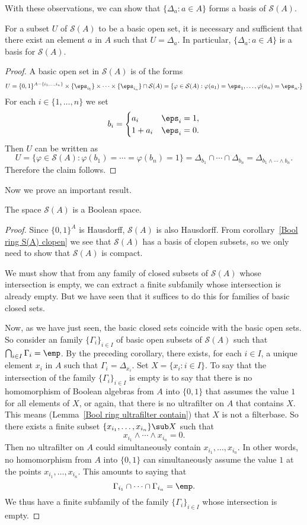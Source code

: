 With these observations, we can show that $\{\Delta_a:a\in A\}$ forms a basis of $\mathcal{S}(A)$.
\begin{proposition}\label{Bool ring basic open}
For a subset $U$ of $\mathcal{S}(A)$ to be a basic open set, it is necessary and sufficient that there exist an element $a$ in $A$ such that $U=\Delta_a$. 
In particular, $\{\Delta_a:a\in A\}$ is a basis for $\mathcal{S}(A)$.
\end{proposition}
\begin{proof}
A basic open set in $\mathcal{S}(A)$ is of the forms
\[U=\{0,1\}^{A-\{i_1,\dots,i_n\}}\times\{\eps_{i_1}\}\times\cdots\times\{\eps_{i_n}\}\cap\mathcal{S}(A)=\{\varphi\in\mathcal{S}(A):\varphi(a_1)=\eps_1,\dots,\varphi(a_n)=\eps_n.\}\]
For each $i\in\{1,\dots,n\}$ we set
\[b_i=\begin{cases}
a_i&\eps_i=1,\\
1+a_i&\eps_i=0.
\end{cases}\]
Then $U$ can be written as
\[U=\{\varphi\in\mathcal{S}(A):\varphi(b_1)=\cdots=\varphi(b_n)=1\}=\Delta_{b_1}\cap\cdots\cap\Delta_{b_n}=\Delta_{b_1\wedge\cdots\wedge b_n}.\]
Therefore the claim follows.
\end{proof}
Now we prove an important result.
\begin{proposition}
The space $\mathcal{S}(A)$ is a Boolean space.
\end{proposition}
\begin{proof}
Since $\{0,1\}^A$ is Hausdorff, $\mathcal{S}(A)$ is also Hausdorff. From corollary~\ref{Bool ring S(A) clopen} we see that $\mathcal{S}(A)$ has a basis of 
clopen subsets, so we only need to show that $\mathcal{S}(A)$ is compact.\par
We must show that from any family of closed subsets of $\mathcal{S}(A)$ whose intersection is empty, we can extract a finite subfamily whose intersection is already
empty. But we have seen that it suffices to do this for families of basic closed sets.\par
Now, as we have just seen, the basic closed sets coincide with the basic open sets. So consider an family $\{\Gamma_i\}_{i\in I}$ of basic open subsets 
of $\mathcal{S}(A)$ such that $\bigcap_{i\in I}\Gamma_i=\emp$. By the preceding corollary, there exists, for each $i\in I$, a unique element $x_i$ in $A$ such 
that $\Gamma_i=\Delta_{x_i}$. Set $X=\{x_i:i\in I\}$. To say that the intersection of the family $\{\Gamma_i\}_{i\in I}$ is empty is to say that there is no 
homomorphism of Boolean algebras from $A$ into $\{0,1\}$ that assumes the value $1$ for all elements of $X$, or again, that there is no ultrafilter on $A$ that 
contains $X$. This means (Lemma~\ref{Bool ring ultrafilter contain}) that $X$ is not a filterbase. So there exists a finite subset $\{x_{i_1},\dots,x_{i_n}\}\sub X$ 
such that
\[x_{i_1}\wedge\cdots\wedge x_{i_n}=0.\]
Then no ultrafilter on $A$ could simultaneously contain $x_{i_1},\dots,x_{i_n}$. In other words, no homomorphism from $A$ into $\{0,1\}$ can simultaneously assume the value $1$ at the points $x_{i_1},\dots,x_{i_n}$. 
This amounts to saying that
\[\Gamma_{i_1}\cap\cdots\cap\Gamma_{i_n}=\emp.\]
We thus have a finite subfamily of the family $\{\Gamma_{i}\}_{i\in I}$ whose intersection is empty.
\end{proof}
